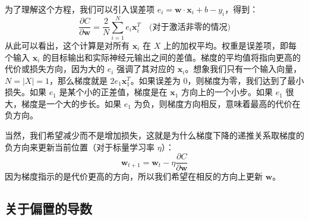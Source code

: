 \documentclass[11pt]{article}
\begin{document}
为了理解这个方程，我们可以引入误差项 $e_i = \mathbf{w}\cdot\mathbf{x}_i+b-y_i$，得到：
\[
\frac{\partial C}{\partial \mathbf{w}} = \frac{2}{N} \sum_{i=1}^N e_i\mathbf{x}_i^T \quad \text{(对于激活非零的情况)}
\]
从此可以看出，这个计算是对所有 $\mathbf{x}_i$ 在 $X$ 上的加权平均。权重是误差项，即每个输入 $\mathbf{x}_i$ 的目标输出和实际神经元输出之间的差值。梯度的平均值将指向更高的代价或损失方向，因为大的 $e_i$ 强调了其对应的 $\mathbf{x}_i$。想象我们只有一个输入向量，$N=|X|=1$，那么梯度就是 $2e_1\mathbf{x}_1^T$。如果误差为 0，则梯度为零，我们达到了最小损失。如果 $e_1$ 是某个小的正差值，梯度是在 $\mathbf{x}_1$ 方向上的一个小步。如果 $e_1$ 很大，梯度是一个大的步长。如果 $e_1$ 为负，则梯度方向相反，意味着最高的代价在负方向。

当然，我们希望减少而不是增加损失，这就是为什么梯度下降的递推关系取梯度的负方向来更新当前位置（对于标量学习率 $\eta$）：
\[ \mathbf{w}_{t+1} = \mathbf{w}_{t} - \eta \frac{\partial C}{\partial \mathbf{w}} \]
因为梯度指示的是代价更高的方向，所以我们希望在相反的方向上更新 $\mathbf{w}$。

\subsection{关于偏置的导数}\label{sec6.2}
\end{document}
